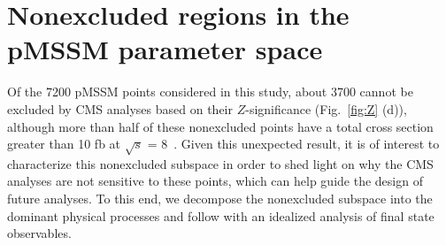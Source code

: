 \section{Nonexcluded regions in the pMSSM parameter space}

\label{sec:unexplored}
Of the 7200 pMSSM points considered in this study, about 3700 cannot be
excluded by CMS analyses based on their $Z$-significance (Fig.~\ref{fig:Z} (d)), although more
than half of these nonexcluded points have a total cross section greater than 10 fb at $\sqrt{s}$ = 8~\TeV.
Given this unexpected result, it is of interest to characterize this nonexcluded
subspace in order to shed light on why the CMS analyses are not
sensitive to these points, which can help guide the design of future analyses. To this end, we decompose the nonexcluded subspace into the dominant physical processes and
follow with an idealized analysis of final state
observables.

